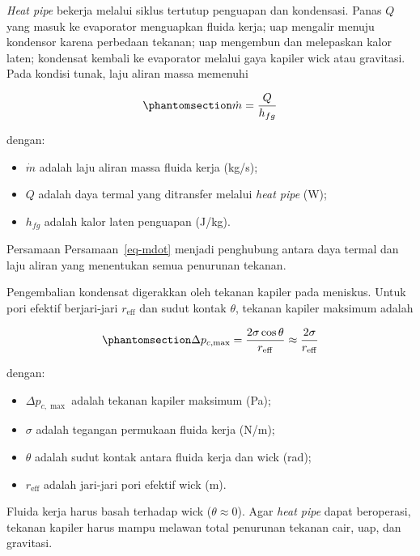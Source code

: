 \documentclass[
  indonesian,
  12pt,
  a4paper,
]{report}
\providecommand{\tightlist}{%
  \setlength{\itemsep}{0pt}\setlength{\parskip}{0pt}}
\begin{document}
\emph{Heat pipe} bekerja melalui siklus tertutup penguapan dan
kondensasi. Panas \(Q\) yang masuk ke evaporator menguapkan fluida
kerja; uap mengalir menuju kondensor karena perbedaan tekanan; uap
mengembun dan melepaskan kalor laten; kondensat kembali ke evaporator
melalui gaya kapiler wick atau gravitasi. Pada kondisi tunak, laju
aliran massa memenuhi

\begin{equation}\protect\phantomsection\label{eq-mdot}{ \dot{m} = \frac{Q}{h_{fg}} }\end{equation}

dengan:

\begin{itemize}
\tightlist
\item
  \(\dot{m}\) adalah laju aliran massa fluida kerja (kg/s);
\item
  \(Q\) adalah daya termal yang ditransfer melalui \emph{heat pipe} (W);
\item
  \(h_{fg}\) adalah kalor laten penguapan (J/kg).
\end{itemize}

Persamaan Persamaan~\ref{eq-mdot} menjadi penghubung antara daya termal
dan laju aliran yang menentukan semua penurunan tekanan.

Pengembalian kondensat digerakkan oleh tekanan kapiler pada meniskus.
Untuk pori efektif berjari-jari \(r_{\mathrm{eff}}\) dan sudut kontak
\(\theta\), tekanan kapiler maksimum adalah

\begin{equation}\protect\phantomsection\label{eq-capillary}{ \Delta p_{c,\max} = \frac{2\sigma\cos\theta}{r_{\mathrm{eff}}}
   \approx \frac{2\sigma}{r_{\mathrm{eff}}} }\end{equation}

dengan:

\begin{itemize}
\tightlist
\item
  \(\Delta p_{c,\max}\) adalah tekanan kapiler maksimum (Pa);
\item
  \(\sigma\) adalah tegangan permukaan fluida kerja (N/m);
\item
  \(\theta\) adalah sudut kontak antara fluida kerja dan wick (rad);
\item
  \(r_{\mathrm{eff}}\) adalah jari-jari pori efektif wick (m).
\end{itemize}

Fluida kerja harus basah terhadap wick (\(\theta \approx 0\)). Agar
\emph{heat pipe} dapat beroperasi, tekanan kapiler harus mampu melawan
total penurunan tekanan cair, uap, dan gravitasi.
\end{document}
